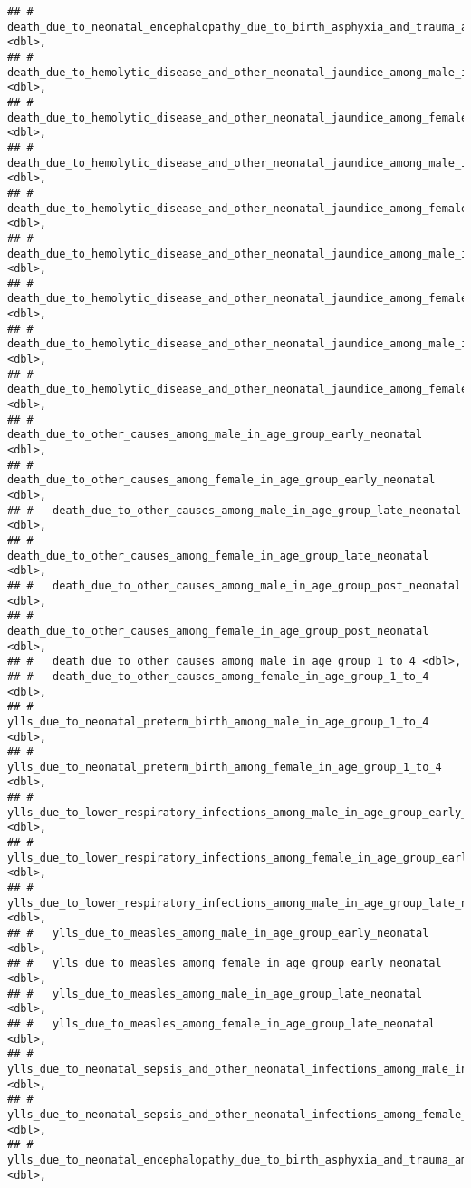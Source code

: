 \documentclass[]{article}
\begin{document}
\begin{verbatim}
## #   death_due_to_neonatal_encephalopathy_due_to_birth_asphyxia_and_trauma_among_female_in_age_group_1_to_4 <dbl>,
## #   death_due_to_hemolytic_disease_and_other_neonatal_jaundice_among_male_in_age_group_early_neonatal <dbl>,
## #   death_due_to_hemolytic_disease_and_other_neonatal_jaundice_among_female_in_age_group_early_neonatal <dbl>,
## #   death_due_to_hemolytic_disease_and_other_neonatal_jaundice_among_male_in_age_group_late_neonatal <dbl>,
## #   death_due_to_hemolytic_disease_and_other_neonatal_jaundice_among_female_in_age_group_late_neonatal <dbl>,
## #   death_due_to_hemolytic_disease_and_other_neonatal_jaundice_among_male_in_age_group_post_neonatal <dbl>,
## #   death_due_to_hemolytic_disease_and_other_neonatal_jaundice_among_female_in_age_group_post_neonatal <dbl>,
## #   death_due_to_hemolytic_disease_and_other_neonatal_jaundice_among_male_in_age_group_1_to_4 <dbl>,
## #   death_due_to_hemolytic_disease_and_other_neonatal_jaundice_among_female_in_age_group_1_to_4 <dbl>,
## #   death_due_to_other_causes_among_male_in_age_group_early_neonatal <dbl>,
## #   death_due_to_other_causes_among_female_in_age_group_early_neonatal <dbl>,
## #   death_due_to_other_causes_among_male_in_age_group_late_neonatal <dbl>,
## #   death_due_to_other_causes_among_female_in_age_group_late_neonatal <dbl>,
## #   death_due_to_other_causes_among_male_in_age_group_post_neonatal <dbl>,
## #   death_due_to_other_causes_among_female_in_age_group_post_neonatal <dbl>,
## #   death_due_to_other_causes_among_male_in_age_group_1_to_4 <dbl>,
## #   death_due_to_other_causes_among_female_in_age_group_1_to_4 <dbl>,
## #   ylls_due_to_neonatal_preterm_birth_among_male_in_age_group_1_to_4 <dbl>,
## #   ylls_due_to_neonatal_preterm_birth_among_female_in_age_group_1_to_4 <dbl>,
## #   ylls_due_to_lower_respiratory_infections_among_male_in_age_group_early_neonatal <dbl>,
## #   ylls_due_to_lower_respiratory_infections_among_female_in_age_group_early_neonatal <dbl>,
## #   ylls_due_to_lower_respiratory_infections_among_male_in_age_group_late_neonatal <dbl>,
## #   ylls_due_to_measles_among_male_in_age_group_early_neonatal <dbl>,
## #   ylls_due_to_measles_among_female_in_age_group_early_neonatal <dbl>,
## #   ylls_due_to_measles_among_male_in_age_group_late_neonatal <dbl>,
## #   ylls_due_to_measles_among_female_in_age_group_late_neonatal <dbl>,
## #   ylls_due_to_neonatal_sepsis_and_other_neonatal_infections_among_male_in_age_group_1_to_4 <dbl>,
## #   ylls_due_to_neonatal_sepsis_and_other_neonatal_infections_among_female_in_age_group_1_to_4 <dbl>,
## #   ylls_due_to_neonatal_encephalopathy_due_to_birth_asphyxia_and_trauma_among_male_in_age_group_1_to_4 <dbl>,

\end{verbatim}
\end{document}
